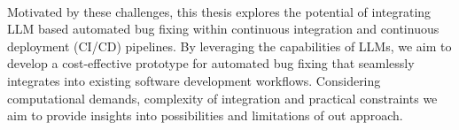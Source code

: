 \\
Motivated by these challenges, this thesis explores the potential of integrating LLM based automated bug fixing within continuous integration and continuous deployment (CI/CD) pipelines. By leveraging the capabilities of LLMs, we aim to develop a cost-effective prototype for automated bug fixing that seamlessly integrates into existing software development workflows. Considering computational demands, complexity of integration and practical constraints we aim to provide insights into possibilities and limitations of out approach.


